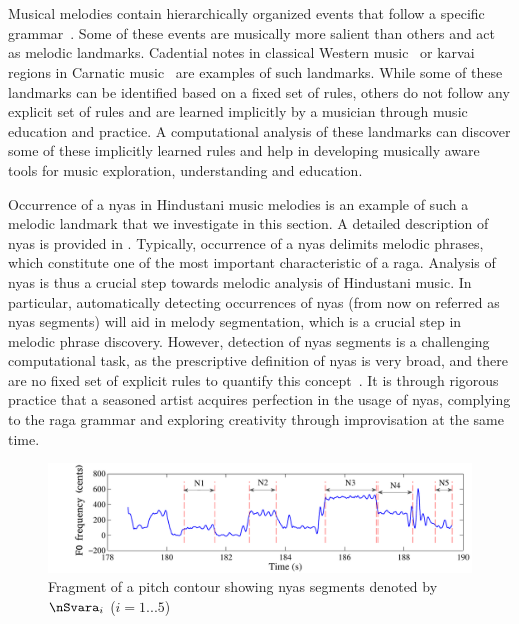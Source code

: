 {\section{}
\label{sec:pre_processing_nyas_segmentation}

Musical melodies contain hierarchically organized events that follow a specific grammar~\citep{Patel07BOOK}. Some of these events are musically more salient than others and act as melodic landmarks. Cadential notes in classical Western music~\citep{GroveCadence} or \gls{karvai} regions in Carnatic music~\citep{sambamoorthy:1998} are examples of such landmarks. While some of these landmarks can be identified based on a fixed set of rules, others do not follow any explicit set of rules and are learned implicitly by a musician through music education and practice. A computational analysis of these landmarks can discover some of these implicitly learned rules and help in developing musically aware tools for music exploration, understanding and education. 

Occurrence of a \gls{nyas} in Hindustani music melodies is an example of such a melodic landmark that we investigate in this section. A detailed description of \gls{nyas} is provided in . Typically, occurrence of a \gls{nyas} delimits melodic phrases, which constitute one of the most important characteristic of a \gls{raga}. Analysis of \gls{nyas} is thus a crucial step towards melodic analysis of Hindustani music. In particular, automatically detecting occurrences of \gls{nyas} (from now on referred as \gls{nyas} segments) will aid in melody segmentation, which is a crucial step in melodic phrase discovery. However, detection of \gls{nyas} segments is a challenging computational task, as the prescriptive definition of \gls{nyas} is very broad, and there are no fixed set of explicit rules to quantify this concept~\citep[p. 73]{Dey2008}. It is through rigorous practice that a seasoned artist acquires perfection in the usage of \gls{nyas}, complying to the \gls{raga} grammar and exploring creativity through improvisation at the same time. 


\begin{figure}
	\begin{center}
		\includegraphics[width=\figSizeHundred]{ch05_preprocessing/figures/NyasFragmentChallenge.pdf}
	\end{center}
	\caption[Fragment of a pitch contour showing \gls{nyas} segments]{Fragment of a pitch contour showing \gls{nyas} segments denoted by $\nSvara_i$ ($i={1...5}$)}
	\label{fig:nyas_segments_example}
\end{figure}

}
